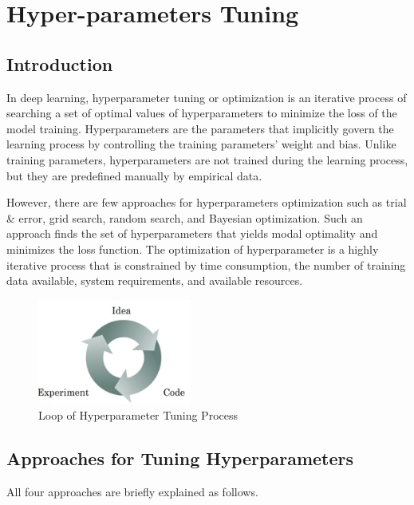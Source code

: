 \chapter{Hyper-parameters Tuning}
\label{ch:Hyper-parameters-Tuning}

\section{Introduction}
In deep learning, hyperparameter tuning or optimization is an iterative process of searching a set of optimal values of hyperparameters to minimize the loss of the model training. Hyperparameters are the parameters that implicitly govern the learning process by controlling the training parameters' weight and bias. Unlike training parameters, hyperparameters are not trained during the learning process, but they are predefined manually by empirical data. 

However, there are few approaches for hyperparameters optimization such as trial \& error, grid search, random search, and Bayesian optimization. Such an approach finds the set of hyperparameters that yields modal optimality and minimizes the loss function. The optimization of hyperparameter is a highly iterative process that is constrained by time consumption, the number of training data available, system requirements, and available resources.  
  

\begin{figure}
    \centering
    \includegraphics[width=0.45\textwidth]{Images/hypertuning.png}
    \caption{Loop of Hyperparameter Tuning Process \cite{coursera1}}
    \label{hypertuning}
\end{figure} 

\section{Approaches for Tuning Hyperparameters} 
All four approaches are briefly explained as follows. 

